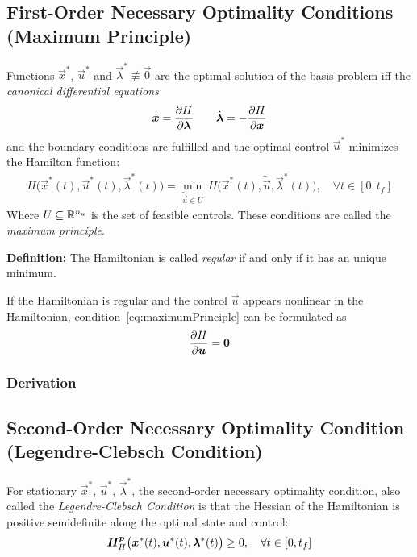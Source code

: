 		\subsection{First-Order Necessary Optimality Conditions (Maximum Principle)}
			Functions \( \vec{x}^\ast \), \( \vec{u}^\ast \) and \( \vec{\lambda}^\ast \not\equiv \vec{0} \) are the optimal solution of the basis problem iff the \emph{canonical differential equations}
			\begin{align*}
				\dot{\bm{x}} = \pdv{H}{\bm{\lambda}} \qquad \dot{\bm{\lambda}} = -\pdv{H}{\bm{x}}
			\end{align*}
			and the boundary conditions are fulfilled and the optimal control \(\vec{u}^\ast\) minimizes the Hamilton function:
			\begin{align}
				H\big(\vec{x}^\ast(t), \vec{u}^\ast(t), \vec{\lambda}^\ast(t)\big) = \min_{\tilde{\vec{u}} \in U} \, H\big(\vec{x}^\ast(t), \tilde{\vec{u}}, \vec{\lambda}^\ast(t)\big),\quad \forall t \in [0, t_f]  \label{eq:maximumPrinciple}
			\end{align}
			Where \( U \subseteq \mathbb{R}^{n_u} \) is the set of feasible controls. These conditions are called the \emph{maximum principle}.

			\textbf{Definition:} The Hamiltonian is called \emph{regular} if and only if it has an unique minimum.

			If the Hamiltonian is regular and the control \(\vec{u}\) appears nonlinear in the Hamiltonian, condition~\eqref{eq:maximumPrinciple} can be formulated as
			\begin{align*}
				\pdv{H}{\bm{u}} = \bm{0}
			\end{align*}

			\subsubsection{Derivation} %

		\subsection{Second-Order Necessary Optimality Condition (Legendre-Clebsch Condition)} %
			For stationary \(\vec{x}^\ast\), \(\vec{u}^\ast\), \(\vec{\lambda}^\ast\), the second-order necessary optimality condition, also called the \emph{Legendre-Clebsch Condition} is that the Hessian of the Hamiltonian is positive semidefinite along the optimal state and control:
			\begin{align*}
				\bm{H}_H^{\bm{p}}\big(\bm{x}^\ast(t), \bm{u}^\ast(t), \bm{\lambda}^\ast(t)\big) \geq 0,\quad \forall t \in [0, t_f]
			\end{align*}

